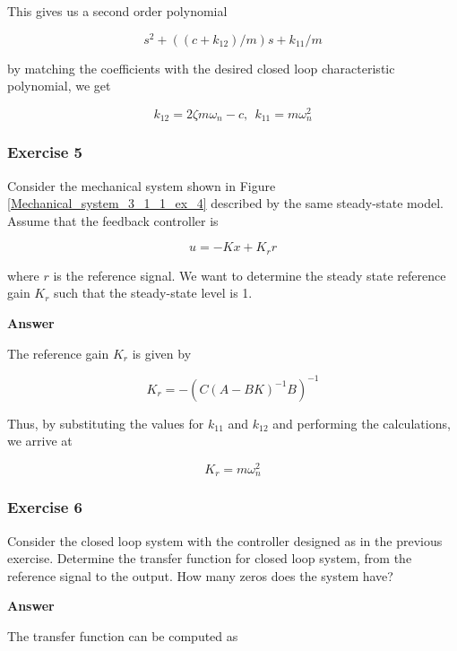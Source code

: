 This gives us a second order polynomial

\begin{equation}
s^2 + ((c + k_{12})/m)s + k_{11}/m
\end{equation}

by matching the coefficients with the desired closed loop characteristic polynomial, we get

\begin{equation}
k_{12} = 2 \zeta m\omega_{n} -c, ~~ k_{11} = m \omega_{n}^{2}
\end{equation}

\subsubsection{Exercise 5}

Consider the mechanical system shown in Figure \ref{Mechanical_system_3_1_1_ex_4} described by the same steady-state model. Assume that the feedback controller is

\begin{equation}
u = -Kx + K_r r 
\end{equation} 

where $r$ is the reference signal. We want to determine the steady state reference gain $K_r$ such that the steady-state level is 1.

\textbf{Answer}

The reference gain $K_r$ is given by 

\begin{equation}
K_r = - ( C(A-BK)^{-1}B)^{-1} 
\end{equation}

Thus, by substituting the values for $k_{11}$ and $k_{12}$ and performing the calculations, we arrive at 

\begin{equation}
K_r = m\omega_{n}^{2}
\end{equation}

\subsubsection{Exercise 6}

Consider the closed loop system with the controller designed as in the previous exercise. Determine the transfer function for closed loop system, from the reference signal to the output.  How many zeros does the system have?

\textbf{Answer}

The transfer function can be computed as

